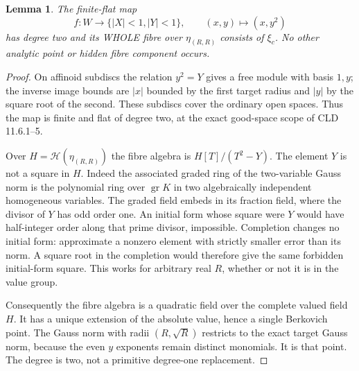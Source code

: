 \documentclass[11pt]{article}
\newtheorem{lemma}[theorem]{Lemma}
\begin{document}
\begin{lemma}\label{fibre}
The finite-flat map
\[
 f:W\longrightarrow\{|X|<1,|Y|<1\},\qquad (x,y)\longmapsto(x,y^2)
\]
has degree two and its WHOLE fibre over $\eta_{(R,R)}$ consists
of $\xi_c$. No other analytic point or hidden fibre component occurs.
\end{lemma}
\begin{proof}
On affinoid subdiscs the relation $y^2=Y$ gives a free module
with basis $1,y$; the inverse image bounds are $|x|$ bounded by the
first target radius and $|y|$ by the square root of the second.
These subdiscs cover the ordinary open spaces. Thus the map is
finite and flat of degree two, at the exact good-space scope of
CLD 11.6.1--5.

Over $H=\mathscr H(\eta_{(R,R)})$ the fibre algebra is
$H[T]/(T^2-Y)$. The element $Y$ is not a square in $H$.
Indeed the associated graded ring of the two-variable Gauss norm
is the polynomial ring over $\operatorname{gr}K$ in two algebraically
independent homogeneous variables. The graded field embeds in its
fraction field, where the divisor of $Y$ has odd order one.
An initial form whose square were $Y$ would have half-integer order
along that prime divisor, impossible. Completion changes no initial
form: approximate a nonzero element with strictly smaller error than
its norm. A square root in the completion would therefore give the
same forbidden initial-form square. This works for arbitrary real
$R$, whether or not it is in the value group.

Consequently the fibre algebra is a quadratic field over the complete
valued field $H$. It has a unique extension of the absolute value,
hence a single Berkovich point. The Gauss norm with radii
$(R,\sqrt R)$ restricts to the exact target Gauss norm, because
the even $y$ exponents remain distinct monomials. It is that point.
The degree is two, not a primitive degree-one replacement.
\end{proof}
\end{document}

